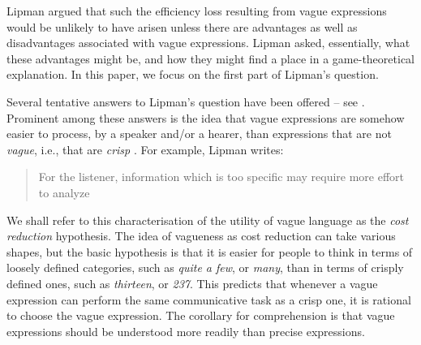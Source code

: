 Lipman argued that such the efficiency loss resulting from vague expressions would be unlikely to have arisen unless there are advantages as well as disadvantages associated with vague expressions. Lipman asked, essentially, what these advantages might be, and how they might find a place in a game-theoretical explanation. In this paper, we focus on the first part of Lipman's question.

Several tentative answers to Lipman's question have been offered -- see \citet{van2009utility, van2010vagueness}. Prominent among these answers is the idea that vague expressions are somehow easier to process, by a speaker and/or a hearer, than expressions that are not \emph{vague}, i.e., that are \emph{crisp} \citep[e.g.,][]{lipmanvague,De-Jaegher:2003lr,vanrooij2003lr}. For example, Lipman writes: \begin{quotation}For the listener, information which is too specific may require more effort to analyze \citep[][p.\ 11]{lipmanvague}  \end{quotation} We shall refer to this characterisation of the utility of vague language as the \emph{cost reduction} hypothesis. The idea of vagueness as cost reduction can take various shapes, but the basic hypothesis is that it is easier for people to think in terms of loosely defined categories, such as \emph{quite a few}, or \emph{many}, than in terms of crisply defined ones, such as \emph{thirteen}, or \emph{237}. This predicts that whenever a vague expression can perform the same communicative task as a crisp one, it is rational to choose the vague expression. The corollary for comprehension is that vague expressions should be understood more readily than precise expressions. 

